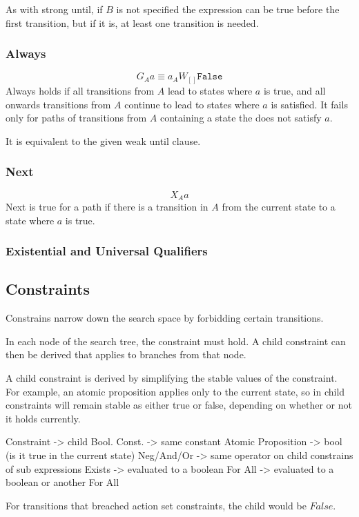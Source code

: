 \documentclass[a4paper,11pt]{article}
\begin{document}
	As with strong until, if $B$ is not specified the expression can be true before the first transition, but if it is, at least one transition is needed.
	
	\subsubsection{Always}
	$$G{_Aa} \equiv a _A W{_{[]} \texttt{False}} $$
	Always holds if all transitions from $A$ lead to states where $a$ is true, and all onwards transitions from $A$ continue to lead to states where $a$ is satisfied. It fails only for paths of transitions from $A$ containing a state the does not satisfy $a$.
	
	It is equivalent to the given weak until clause.
	
	\subsubsection{Next}
	$$X{_Aa}$$
	Next is true for a path if there is a transition in $A$ from the current state to a state where $a$ is true. 
	
	\subsubsection{Existential and Universal Qualifiers}
	
	
	\subsection{Constraints}
	Constrains narrow down the search space by forbidding certain transitions.
	
	In each node of the search tree, the constraint must hold. A child constraint can then be derived that applies to branches from that node. 
	
	A child constraint is derived by simplifying the stable values of the constraint. For example, an atomic proposition applies only to the current state, so in child constraints will remain stable as either true or false, depending on whether or not it holds currently.
	
	Constraint -> child 
	Bool. Const. -> same constant
	Atomic Proposition -> bool (is it true in the current state)
	Neg/And/Or -> same operator on child constrains of sub expressions
	Exists -> evaluated to a boolean
	For All -> evaluated to a boolean or another For All
	
	For transitions that breached action set constraints, the child would be $False$. 
	
\end{document}
